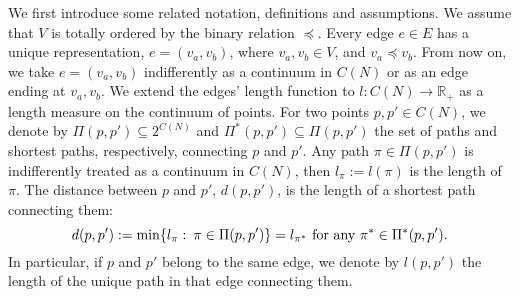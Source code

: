 \documentclass[review]{elsarticle}
\newcommand{\bR}{\mathbb{R}}
\newcommand{\cP}{{\mathcal P}}
\newcommand{\dlt}{{\delta}}
\DeclareMathOperator*{\e}{e}
\DeclarePairedDelimiter\ceil{\lceil}{\rceil}
\theoremstyle{definition}
\newtheorem{definition}{Definition}[section]
\newtheorem{lemma}{Lemma}[section]
\begin{document}
We first introduce some related notation, definitions and assumptions.
We assume that $V$ is totally ordered by the binary relation $\preceq$. Every edge $e \in E$ has a unique representation, $e = (v_a, v_b)$, where $v_a, v_b \in V$, and $v_a \preceq v_b$. From now on, we take $e=(v_a, v_b)$ indifferently as a continuum in $C(N)$ or as an edge ending at  $v_a, v_b$. We extend the edges' length function to  $l: C(N) \to \bR_+$ as a length measure on the continuum of points.   For two points $p, p' \in C(N)$, we denote by $\Pi(p,p') \subseteq 2^{C(N)}$ and $\Pi^*(p,p') \subseteq \Pi(p,p')$ the set of paths and shortest paths, respectively, connecting $p$ and $p'$. Any path $\pi\in \Pi(p,p')$ is indifferently treated as a continuum in $C(N)$, then $l_{\pi}:=l(\pi)$ is the length of $\pi$.  The distance between $p$ and  $p'$, $d(p, p')$, is the length of a shortest path connecting them:
$$d(p,p') := \min\{l_{\pi}: \:\pi\in \Pi(p,p')\}=l_{\pi^*} \textup{ for any } \pi^*\in \Pi^*(p,p').$$
In particular, if $p$ and $p'$ belong to the same edge, we denote by $l(p,p')$ the length of the unique path in that edge connecting them.
\end{document}
